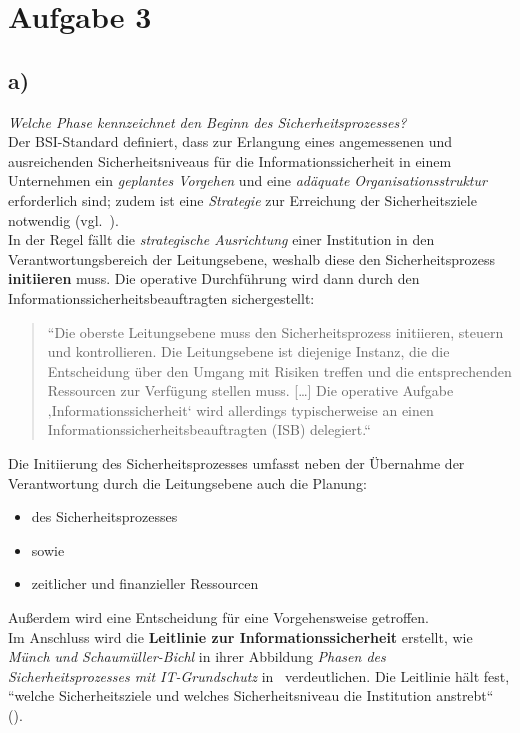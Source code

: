 \chapter{Aufgabe 3}

\section{a)}

\textit{Welche Phase kennzeichnet den Beginn des Sicherheitsprozesses?}\\

\noindent
Der BSI-Standard definiert, dass zur Erlangung eines angemessenen und ausreichenden Sicherheitsniveaus für die Informationssicherheit in einem Unternehmen ein \textit{geplantes Vorgehen} und eine \textit{adäquate Organisationsstruktur} erforderlich sind; zudem ist eine \textit{Strategie} zur Erreichung der Sicherheitsziele notwendig (vgl.~\cite[20]{BSI200-2}).\\

\noindent
In der Regel fällt die \textit{strategische Ausrichtung} einer Institution in den Verantwortungsbereich der Leitungsebene, weshalb diese den Sicherheitsprozess \textbf{initiieren} muss.
Die operative Durchführung wird dann durch den Informationssicherheitsbeauftragten sichergestellt:

\blockquote[{\cite[20]{BSI200-2}}]{
    ``Die oberste Leitungsebene muss den Sicherheitsprozess initiieren, steuern und kontrollieren. Die Leitungsebene ist diejenige Instanz, die die Entscheidung über den Umgang mit Risiken treffen und die
    entsprechenden Ressourcen zur Verfügung stellen muss.
    [\ldots]
    Die operative Aufgabe ‚Informationssicherheit‘ wird allerdings typischerweise an
    einen Informationssicherheitsbeauftragten (ISB) delegiert.``
}

\noindent
Die Initiierung des Sicherheitsprozesses umfasst neben der Übernahme der Verantwortung durch die Leitungsebene auch die Planung:
\begin{itemize}
    \itemsep0.5em
    \item des Sicherheitsprozesses
    \item[] sowie
    \item zeitlicher und finanzieller Ressourcen
\end{itemize}

\noindent
Außerdem wird eine Entscheidung für eine Vorgehensweise getroffen.\\

\noindent
Im Anschluss wird die \textbf{Leitlinie zur Informationssicherheit} erstellt, wie \textit{Münch und Schaumüller-Bichl} in ihrer Abbildung \textit{Phasen des Sicherheitsprozesses mit IT-Grundschutz} in~\cite[\textbf{Abb. 3.2}, 32]{ITS2} verdeutlichen.
Die Leitlinie hält fest, ``welche Sicherheitsziele und welches Sicherheitsniveau die Institution anstrebt`` (\cite[32]{ITS2}).


